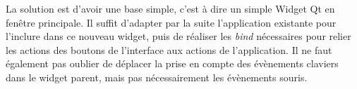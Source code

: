 La solution est d'avoir une base simple, c'est à dire un simple Widget Qt en
fenêtre principale. Il suffit d'adapter par la suite l'application existante
pour l'inclure dans ce nouveau widget, puis de réaliser les \emph{bind}
nécessaires pour relier les actions des boutons de l'interface aux actions de
l'application. Il ne faut également pas oublier de déplacer la prise en compte
des évènements claviers dans le widget parent, mais pas nécessairement les
évènements souris.
